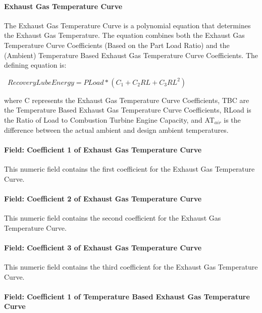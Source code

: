 \paragraph{Exhaust Gas Temperature Curve}\label{exhaust-gas-temperature-curve}

The Exhaust Gas Temperature Curve is a polynomial equation that determines the Exhaust Gas Temperature. The equation combines both the Exhaust Gas Temperature Curve Coefficients (Based on the Part Load Ratio) and the (Ambient) Temperature Based Exhaust Gas Temperature Curve Coefficients. The defining equation is:

~\(RecoveryLubeEnergy = PLoad * ({C_1} + {C_2}RL + {C_3}R{L^2})\)

where C represents the Exhaust Gas Temperature Curve Coefficients, TBC are the Temperature Based Exhaust Gas Temperature Curve Coefficients, RLoad is the Ratio of Load to Combustion Turbine Engine Capacity, and AT\(_{air}\) is the difference between the actual ambient and design ambient temperatures.

\paragraph{Field: Coefficient 1 of Exhaust Gas Temperature Curve}\label{field-coefficient-1-of-exhaust-gas-temperature-curve}

This numeric field contains the first coefficient for the Exhaust Gas Temperature Curve.

\paragraph{Field: Coefficient 2 of Exhaust Gas Temperature Curve}\label{field-coefficient-2-of-exhaust-gas-temperature-curve}

This numeric field contains the second coefficient for the Exhaust Gas Temperature Curve.

\paragraph{Field: Coefficient 3 of Exhaust Gas Temperature Curve}\label{field-coefficient-3-of-exhaust-gas-temperature-curve}

This numeric field contains the third coefficient for the Exhaust Gas Temperature Curve.

\paragraph{Field: Coefficient 1 of Temperature Based Exhaust Gas Temperature Curve}\label{field-coefficient-1-of-temperature-based-exhaust-gas-temperature-curve}

